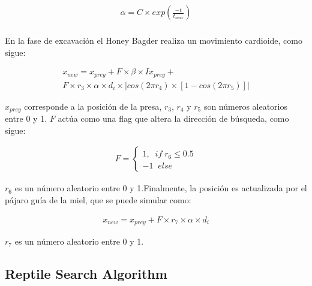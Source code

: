 \documentclass[conference]{IEEEtran}
\begin{document}
\begin{equation}
\begin{gathered}
\alpha = C \times exp (\frac{-t}{t_{max}})\\
\end{gathered}
\label{eq29}
\end{equation}

\noindent En la fase de excavación el Honey Bagder realiza un movimiento cardioide, como sigue:

\begin{equation}
\begin{gathered}
x_{new}=x_{prey}+F \times \beta \times I x_{prey} + \\
F \times r_3 \times \alpha \times d_i  \times |cos(2\pi r_4) \times [1-cos(2\pi r_5)]|
\end{gathered}
\label{eq30}
\end{equation}

\noindent $x_{prey}$ corresponde a la posición de la presa, $r_3$, $r_4$ y $r_5$ son números aleatorios entre 0 y 1. $F$ actúa como una flag que altera la dirección de búsqueda, como sigue:

\begin{equation}
\begin{gathered}
F=
\begin{cases}
1, \; \; if \; r_6 \leq 0.5 \\
-1 \; \; else
\end{cases}
\end{gathered}
\label{eq31}
\end{equation}    

\noindent $r_6$ es un número aleatorio entre 0 y 1.Finalmente, la posición es actualizada por el pájaro guía de la miel, que se puede simular como:

\begin{equation}
\begin{gathered}
x_{new}=x_{prey}+F\times r_7\times \alpha \times d_i
\end{gathered}
\label{eq32}
\end{equation}

\noindent $r_7$ es un número aleatorio entre 0 y 1.

\subsection{Reptile Search Algorithm}
\end{document}
